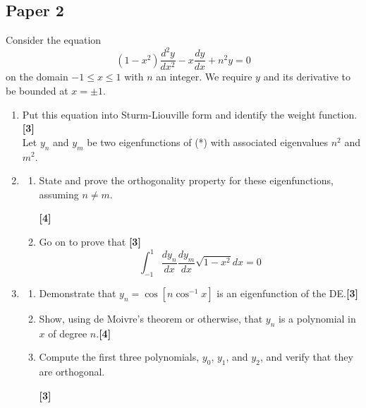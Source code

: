 \documentclass[a4paper]{article}
\begin{document}
\subsection{Paper 2}
\begin{qns}
Consider the equation
\begin{equation}
    (1-x^2)\frac{d^2y}{dx^2}-x\frac{dy}{dx}+n^2y=0\tag{*}
\end{equation}
on the domain $-1\leq x\leq 1$ with $n$ an integer. We require $y$ and its derivative to be bounded at $x=\pm 1$.
\begin{enumerate}[label=(\roman*)]
\item Put this equation into Sturm-Liouville form and identify the weight function.\hfill\textbf{[3]}\\[5pt]
Let $y_n$ and $y_m$ be two eigenfunctions of (*) with associated eigenvalues $n^2$ and $m^2$.
\item
\begin{enumerate}[label=(\alph*)]
\item State and prove the orthogonality property for these eigenfunctions, assuming $n\neq m$.

\hfill\textbf{[4]}
\item Go on to prove that \hfill\textbf{[3]}
$$\int_{-1}^1\frac{dy_n}{dx}\frac{dy_m}{dx}\sqrt{1-x^2}dx=0$$
\end{enumerate}
\item
\begin{enumerate}[label=(\alph*)]
\item Demonstrate that $y_n=\cos[n\cos^{-1}x]$ is an eigenfunction of the DE.\hfill\textbf{[3]}
\item Show, using de Moivre’s theorem or otherwise, that $y_n$ is a polynomial in $x$ of degree $n$.\hfill\textbf{[4]}
\item Compute the first three polynomials, $y_0$, $y_1$, and $y_2$, and verify that they are orthogonal.

\hfill\textbf{[3]}
\end{enumerate}
\end{enumerate}
\end{qns}
\end{document}
